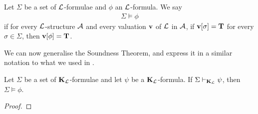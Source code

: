 \begin{boxconvention}
    Let $\Sigma$ be a set of $\mathcal{L}$-formulae and $\phi$ an $\mathcal{L}$-formula. We say
    \begin{align*}
        \Sigma \models \phi
    \end{align*}
    if for every $\mathcal{L}$-structure $\mathcal{A}$ and every valuation $\mathbf{v}$ of $\mathcal{L}$ in $\mathcal{A}$, if $\mathbf{v}\!\left[ \sigma \right] = \mathbf{T}$ for every $\sigma \in \Sigma$, then $\mathbf{v}\!\left[ \phi \right] = \mathbf{T}$.
\end{boxconvention}

We can now generalise the Soundness Theorem, and express it in a similar notation to what we used in .

\begin{boxcorollary}
    Let $\Sigma$ be a set of $\mathbf{K}_{\mathcal{L}}$-formulae and let $\psi$ be a $\mathbf{K}_{\mathcal{L}}$-formula. If $\Sigma \vdash_{\mathbf{K}_{\mathcal{L}}} \psi$, then $\Sigma \models \phi$.
\end{boxcorollary}
\begin{proof}
    \sorry %
\end{proof}

